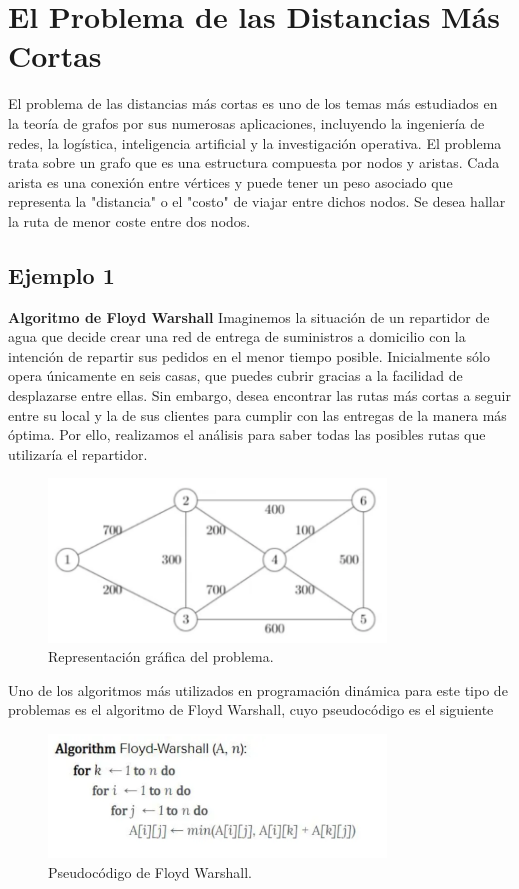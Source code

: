 \section{El Problema de las Distancias Más Cortas}
El problema de las distancias más cortas es uno de los temas más estudiados en la teoría de grafos por sus numerosas aplicaciones, incluyendo la ingeniería de redes, la logística, inteligencia artificial y la investigación operativa. El problema trata sobre un grafo que es una estructura compuesta por nodos y aristas. Cada arista es una conexión entre vértices y puede tener un peso asociado que representa la "distancia" o el "costo" de viajar entre dichos nodos. Se desea hallar la ruta de menor coste entre dos nodos.

\subsection{Ejemplo 1}
\textbf{Algoritmo de Floyd Warshall}
Imaginemos la situación de un repartidor de agua que decide crear una red de entrega de suministros a domicilio con la intención de repartir sus pedidos en el menor tiempo posible. Inicialmente sólo opera únicamente en seis casas, que puedes cubrir gracias a la facilidad de desplazarse entre ellas.
Sin embargo, desea encontrar las rutas más cortas a seguir entre su local y la de sus clientes para cumplir con las entregas de la manera más óptima. Por ello, realizamos el análisis para saber todas las posibles rutas que utilizaría el repartidor.
\begin{figure}[H]
	\centering
	\includegraphics[width=0.8\textwidth]{distancias_cortas_RepresentacionG1.png}
	\caption{Representación gráfica del problema.}
	\label{fig:resultado1}
\end{figure}

Uno de los algoritmos más utilizados en programación dinámica para este tipo de problemas es el algoritmo de Floyd Warshall, cuyo pseudocódigo es el siguiente
\begin{figure}[H]
	\centering
	\includegraphics[width=0.8\textwidth]{distancias_cortas_Pseudo1.png}
	\caption{Pseudocódigo de Floyd Warshall.}
	\label{fig:resultado2}
\end{figure}

